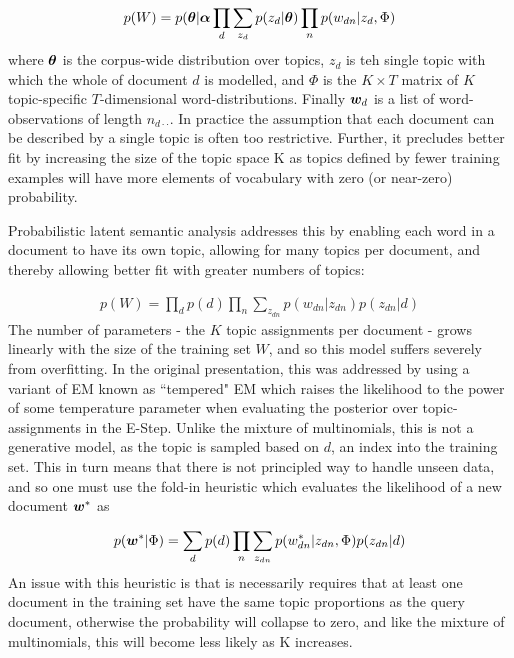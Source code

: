\begin{align}
p(W) = p(\bm \theta|\bm \alpha \prod_d \sum_{z_d} p(z_d|\bm \theta)\prod_n p(w_{dn} | z_d, \Phi)
\end{align}
where $\bm \theta$ is the corpus-wide distribution over topics, $z_d$ is teh single topic with which the whole of document $d$ is modelled, and $\Phi$ is the $K \times T$ matrix of $K$ topic-specific $T$-dimensional word-distributions. Finally $\bm w_d$ is a list of word-observations of length $n_{d\cdot\cdot}$. In practice the assumption that each document can be described by a single topic is often too restrictive. Further, it precludes better fit by increasing the size of the topic space K as topics defined by fewer training examples will have more elements of vocabulary with zero (or near-zero) probability.

Probabilistic latent semantic analysis\cite{Hofmann1999a} addresses this by enabling each word in a document to have its own topic, allowing for many topics per document, and thereby allowing better fit with greater numbers of topics:

\begin{align}
p(W) = \prod_d p(d) \prod_n \sum_{z_{dn}} p(w_{dn}|z_{dn})p(z_{dn}|d)
\end{align}
The number of parameters - the $K$ topic assignments per document - grows linearly with the size of the training set $W$, and so this model suffers severely from overfitting. In the original presentation, this was addressed by using a variant of EM known as ``tempered" EM which raises the likelihood to the power of some temperature parameter when evaluating the posterior over topic-assignments in the E-Step. Unlike the mixture of multinomials, this is not a generative model, as the topic is sampled based on $d$, an index into the training set. This in turn means that there is not principled way to handle unseen data, and so one must use the fold-in heuristic which evaluates the likelihood of a new document $\bm w^*$ as

\begin{align}
p(\bm w^*|\Phi) = \sum_d p(d) \prod_n \sum_{z_{dn}} p(w_{dn}^*|z_{dn}, \Phi) p(z_{dn}|d)
\end{align}
An issue with this heuristic is that is necessarily requires that at least one document in the training set have the same topic proportions as the query document, otherwise the probability will collapse to zero, and like the mixture of multinomials, this will become less likely as K increases.

